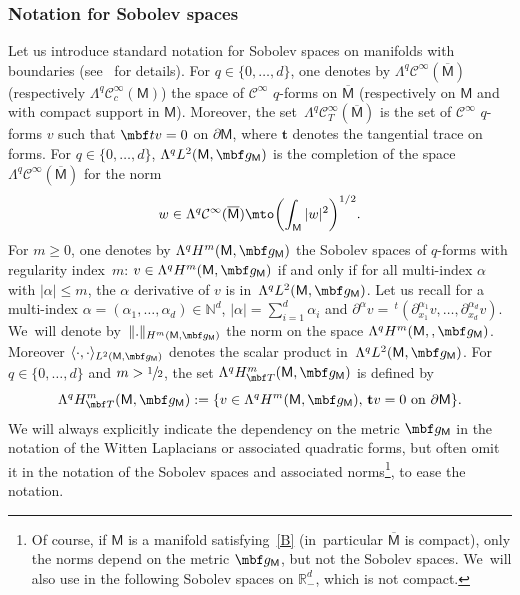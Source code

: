 \label{sec:Witt}

\subsubsection{Notation for Sobolev spaces}

Let us introduce standard notation for Sobolev spaces on manifolds
with boundaries (see~\cite{GSchw} for details).
For $q\in\{0,\ldots,d\}$, one denotes by
$\Lambda^q\mathcal C^{\infty}(\overline{\mathsf M})$ (respectively $\Lambda^q\mathcal C^\infty_c(\mathsf M)$) the space of $\mathcal C^{\infty}$ $q$-forms on
$\overline{\mathsf M}$ (respectively on $\mathsf M$ and with compact support in $\mathsf M$).
Moreover, the set~$\Lambda^q\mathcal C^{\infty}_T(\overline{\mathsf M})$ is the set of
$\mathcal C^{\infty}$ $q$-forms $v$ such that $\mbf tv=0$ on $\partial
\mathsf M$, where $\mathbf t$ denotes the tangential trace on forms.
For $q\in \{0, \ldots,d\}$, $\Lambda^qL^2(\mathsf M,\mbf g_{\mathsf M})$ is the completion of the space $\Lambda^q\mathcal C^{\infty}(\overline{\mathsf M})$ for the norm\vspace*{-3pt}
\[
w\in \Lambda^q\mathcal C^{\infty}(\overline{\mathsf M})\mto
\biggl(\int_{\mathsf M} \vert w\vert^2 \biggr)^{1/2}.
\]
For $m\ge 0$, one denotes by
$\Lambda^qH^m(\mathsf M,\mbf g_{\mathsf M})$ the Sobolev spaces of $q$-forms with
regularity index~$m$: $v\in \Lambda^qH^m(\mathsf M,\mbf g_{\mathsf
M})$ if and only if for all multi-index $\alpha$ with $\vert \alpha
\vert \le m$, the $\alpha$ derivative of $v$ is
in~$\Lambda^qL^2(\mathsf M,\mbf g_{\mathsf M})$. Let us recall for a
multi-index $\alpha=(\alpha_1,\ldots,\alpha_d) \in \mathbb N^d$, $\vert \alpha
\vert= \sum_{i=1}^d \alpha_i$ and $\partial^\alpha v= \,
^t(\partial_{x_1}^{\alpha_1} v, \ldots, \partial_{x_d}^{\alpha_d} v)$. We~will denote by~$\Vert. \Vert_{H^m(\mathsf M,\mbf g_{\mathsf M})}$ the norm on the space $\Lambda^qH^m
(\mathsf M,,\mbf g_{\mathsf M})$. Moreover $\langle
\cdot, \cdot\rangle_{L^2(\mathsf M,\mbf g_{\mathsf M})}$ denotes the scalar product in~$\Lambda^qL^2 (\mathsf M,\mbf g_{\mathsf M})$.
For $q\in\{0,\ldots,d\}$ and $m> \sfrac{1}{2}$, the set $\Lambda^qH^m_{\mbf T}(\mathsf M,\mbf g_{\mathsf M})$ is defined by\vspace*{-1pt}
\[
\Lambda^qH^m_{\mbf T}(\mathsf M,\mbf g_{\mathsf M}):=\{v\in \Lambda^qH^m(\mathsf M,\mbf g_{\mathsf M}),\,
 \mathbf tv=0 \text{ on } \partial \mathsf M\}.
\]
We will always explicitly indicate the dependency
on the metric $\mbf g_{\mathsf M}$ in the notation of the Witten
Laplacians or associated quadratic forms, but often omit it in the notation of the Sobolev
spaces and associated norms\footnote{Of course, if $\mathsf
M$ is a manifold satisfying~\ref{B} (in~particular $\overline{\mathsf
M}$ is compact),
only the norms depend on the metric $\mbf g_{\mathsf M}$, but not
the Sobolev spaces. We~will also use in the following Sobolev spaces
on $\mathbb R_-^d$, which is not compact.}, to ease the notation.
